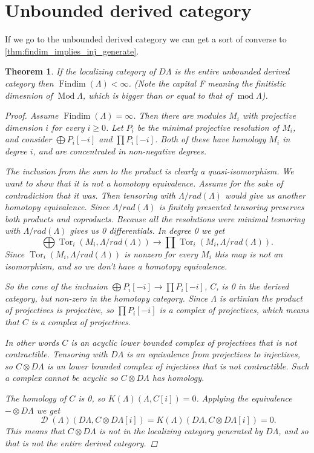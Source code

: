 \documentclass[11pt, a4paper, english]{article}
\newtheorem{theorem}{Theorem}[section]
\theoremstyle{definition}
\DeclareMathOperator{\Tor}{Tor}
\DeclareMathOperator{\Findim}{Findim}
\DeclareMathOperator{\Mod}{Mod}
\def\mod{\operatorname{mod}}
\DeclareMathOperator{\D}{\mathcal{D}}
\begin{document}
\section{Unbounded derived category}

If we go to the unbounded derived category we can get a sort of converse to \cref{thm:findim_implies_inj_generate}.

\begin{theorem}\cite[Theorem~4.3]{Rick19}
	If the localizing category of $D\Lambda$ is the entire unbounded derived category then $\Findim(\Lambda) < \infty$. (Note the capital F meaning the finitistic dimesnion of $\Mod\Lambda$, which is bigger than or equal to that of $\mod\Lambda$).
	
	\begin{proof}
		Assume $\Findim(\Lambda) = \infty$. Then there are modules $M_i$ with projective dimension $i$ for every $i \geq 0$. Let $P_i$ be the minimal projective resolution of $M_i$, and consider $\bigoplus P_i[-i]$ and $\prod P_i[-i]$. Both of these have homology $M_i$ in degree $i$, and are concentrated in non-negative degrees.
		
		The inclusion from the sum to the product is clearly a quasi-isomorphism. We want to show that it is not a homotopy equivalence. Assume for the sake of contradiction that it was. Then tensoring with $\Lambda/rad(\Lambda)$ would give us another homotopy equivalence. Since $\Lambda/rad(\Lambda)$ is finitely presented tensoring preserves both products and coproducts. Because all the resolutions were minimal tesnoring with $\Lambda/rad(\Lambda)$ gives us 0 differentials. In degree 0 we get $$\bigoplus \Tor_i(M_i, \Lambda/rad(\Lambda)) \to \prod \Tor_i(M_i, \Lambda/rad(\Lambda)) .$$
		Since $\Tor_i(M_i, \Lambda/rad(\Lambda))$ is nonzero for every $M_i$ this map is not an isomorphism, and so we don't have a homotopy equivalence.
		
		So the cone of the inclusion $\bigoplus P_i[-i] \to \prod P_i[-i]$, $C$, is 0 in the derived category, but non-zero in the homotopy category. Since $\Lambda$ is artinian the product of projectives is projective\cite[Theorem~3.3]{Chase60}, so $\prod P_i[-i]$ is a complex of projectives, which means that $C$ is a complex of projectives. 
		
		In other words $C$ is an acyclic lower bounded complex of projectives that is not contractible. Tensoring with $D\Lambda$ is an equivalence from projectives to injectives, so $C\otimes D\Lambda$ is an lower bounded complex of injectives that is not contractible. Such a complex cannot be acyclic so $C\otimes D\Lambda$ has homology.
		
		The homology of $C$ is 0, so $K(\Lambda)(\Lambda, C[i]) = 0$. Applying the equivalence $-\otimes D\Lambda$ we get $$\D(\Lambda)(D\Lambda, C\otimes D\Lambda [i])=K(\Lambda)(D\Lambda, C\otimes D\Lambda [i])=0.$$ This means that $C\otimes D\Lambda$ is not in the localizing category generated by $D\Lambda$, and so that is not the entire derived category.
	\end{proof}
\end{theorem}
\end{document}
